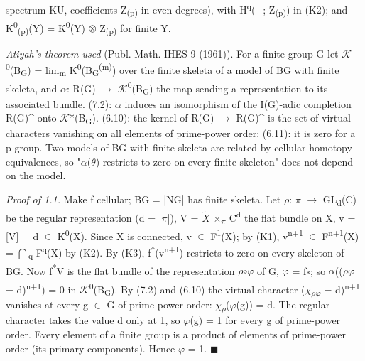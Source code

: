 spectrum KU, coefficients Z\textsubscript{(p)} in even degrees), with H\textsuperscript{q}(\ensuremath{-}; Z\textsubscript{(p)}) in (K2); and K\textsuperscript{0}\textsubscript{(p)}(Y) = K\textsuperscript{0}(Y) \ensuremath{\otimes} Z\textsubscript{(p)} for finite Y.

\emph{Atiyah's theorem used} (Publ. Math. IHES 9 (1961)). For a finite group G let \ensuremath{\mathcal K}\textsuperscript{0}(B\textsubscript{G}) = lim\textsubscript{m} K\textsuperscript{0}(B\textsubscript{G}\textsuperscript{(m)}) over the finite skeleta of a model of BG with finite skeleta, and \ensuremath{\alpha}: R(G) \ensuremath{\to} \ensuremath{\mathcal K}\textsuperscript{0}(B\textsubscript{G}) the map sending a representation to its associated bundle. (7.2): \ensuremath{\alpha} induces an isomorphism of the I(G)-adic completion R(G)\textasciicircum{} onto \ensuremath{\mathcal K}*(B\textsubscript{G}). (6.10): the kernel of R(G) \ensuremath{\to} R(G)\textasciicircum{} is the set of virtual characters vanishing on all elements of prime-power order; (6.11): it is zero for a p-group. Two models of BG with finite skeleta are related by cellular homotopy equivalences, so "\ensuremath{\alpha}(\ensuremath{\theta}) restricts to zero on every finite skeleton" does not depend on the model.

\emph{Proof of 1.1.} Make f cellular; BG = |NG| has finite skeleta. Let \ensuremath{\rho}: \ensuremath{\pi} \ensuremath{\to} GL\textsubscript{d}(C) be the regular representation (d = |\ensuremath{\pi}|), V = \ensuremath{\widetilde{X}} \ensuremath{\times}\textsubscript{\ensuremath{\pi}} C\textsuperscript{d} the flat bundle on X, v = [V] \ensuremath{-} d \ensuremath{\in} K\textsuperscript{0}(X). Since X is connected, v \ensuremath{\in} F\textsuperscript{1}(X); by (K1), v\textsuperscript{n+1} \ensuremath{\in} F\textsuperscript{n+1}(X) = \ensuremath{\bigcap}\textsubscript{q} F\textsuperscript{q}(X) by (K2). By (K3), f\textsuperscript{*}(v\textsuperscript{n+1}) restricts to zero on every skeleton of BG. Now f\textsuperscript{*}V is the flat bundle of the representation \ensuremath{\rho}\ensuremath{\circ}\ensuremath{\varphi} of G, \ensuremath{\varphi} = f\textsubscript{*}; so \ensuremath{\alpha}((\ensuremath{\rho}\ensuremath{\varphi} \ensuremath{-} d)\textsuperscript{n+1}) = 0 in \ensuremath{\mathcal K}\textsuperscript{0}(B\textsubscript{G}). By (7.2) and (6.10) the virtual character (\ensuremath{\chi}\textsubscript{\ensuremath{\rho}\ensuremath{\varphi}} \ensuremath{-} d)\textsuperscript{n+1} vanishes at every g \ensuremath{\in} G of prime-power order: \ensuremath{\chi}\textsubscript{\ensuremath{\rho}}(\ensuremath{\varphi}(g)) = d. The regular character takes the value d only at 1, so \ensuremath{\varphi}(g) = 1 for every g of prime-power order. Every element of a finite group is a product of elements of prime-power order (its primary components). Hence \ensuremath{\varphi} = 1. \ensuremath{\blacksquare}

